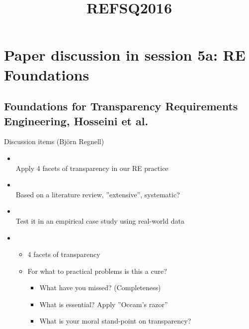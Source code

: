 \documentclass{slides}
\title{REFSQ2016}
\begin{document}
\section{Paper discussion in session 5a: RE Foundations}
\subsection{Foundations for Transparency Requirements Engineering, Hosseini et al.}

\begin{Slide}{Discussion items (Björn Regnell)}
\begin{itemize}
\item  {} \\ \pause
  Apply 4 facets of transparency in our RE practice
\pause\item  {} \\ \pause
  Based on a literature review, ''extensive'', systematic?
\pause\item    {} \\ \pause
        Test it in an empirical case study using real-world data
\pause\item    {} \\ \pause
\begin{itemize}
\item  {} 4 facets of transparency
\item  For what  to practical problems is this a cure?
\pause
\begin{itemize}
\item What have you missed? (Completeness)
\item What is essential? Apply ''Occam's razor''
\item What is your moral stand-point on transparency?
\end{itemize}
\end{itemize}
\end{itemize}

\end{Slide}
\end{document}
